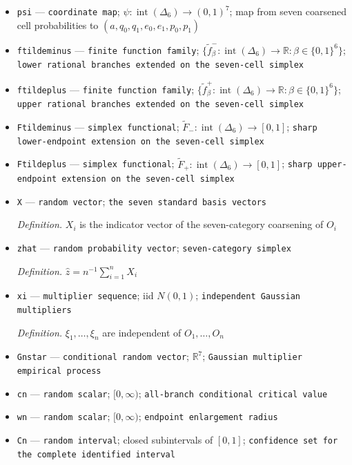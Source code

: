 \documentclass{article}
\begin{document}
\begin{itemize}
  \par\smallskip\noindent\emph{Definition.} \(z=(z_\varnothing,z_{0\mathrm N},z_{1\mathrm N},z_{00},z_{01},z_{10},z_{11})\), where \(z_\varnothing=P(A_0=0)\), \(z_{\ell\mathrm N}=P(A_0=1,L_1=\ell,A_1=0)\), and \(z_{\ell y}=P(A_0=A_1=1,L_1=\ell,Y=y)\) for \(\ell,y\in\{0,1\}\)
  \item \texttt{psi} --- \texttt{coordinate map}; \(\psi:\operatorname{int}(\Delta_6)\to(0,1)^7\); map from seven coarsened cell probabilities to \((a,q_0,q_1,e_0,e_1,p_0,p_1)\)
  \item \texttt{ftildeminus} --- \texttt{finite function family}; \(\{\widetilde f^-_\beta:\operatorname{int}(\Delta_6)\to\mathbb R:\beta\in\{0,1\}^6\}\); \texttt{lower rational branches extended on the seven-\allowbreak{}cell simplex}
  \item \texttt{ftildeplus} --- \texttt{finite function family}; \(\{\widetilde f^+_\beta:\operatorname{int}(\Delta_6)\to\mathbb R:\beta\in\{0,1\}^6\}\); \texttt{upper rational branches extended on the seven-\allowbreak{}cell simplex}
  \item \texttt{Ftildeminus} --- \texttt{simplex functional}; \(\widetilde F_-:\operatorname{int}(\Delta_6)\to[0,1]\); \texttt{sharp lower-\allowbreak{}endpoint extension on the seven-\allowbreak{}cell simplex}
  \item \texttt{Ftildeplus} --- \texttt{simplex functional}; \(\widetilde F_+:\operatorname{int}(\Delta_6)\to[0,1]\); \texttt{sharp upper-\allowbreak{}endpoint extension on the seven-\allowbreak{}cell simplex}
  \item \texttt{X} --- \texttt{random vector}; \texttt{the seven standard basis vectors}
  \par\smallskip\noindent\emph{Definition.} \(X_i\) is the indicator vector of the seven-category coarsening of \(O_i\)
  \item \texttt{zhat} --- \texttt{random probability vector}; \texttt{seven-\allowbreak{}category simplex}
  \par\smallskip\noindent\emph{Definition.} \(\widehat z=n^{-1}\sum_{i=1}^n X_i\)
  \item \texttt{xi} --- \texttt{multiplier sequence}; iid \(N(0,1)\); \texttt{independent Gaussian multipliers}
  \par\smallskip\noindent\emph{Definition.} \(\xi_1,\ldots,\xi_n\) are independent of \(O_1,\ldots,O_n\)
  \item \texttt{Gnstar} --- \texttt{conditional random vector}; \(\mathbb R^7\); \texttt{Gaussian multiplier empirical process}
  \item \texttt{cn} --- \texttt{random scalar}; \([0,\infty)\); \texttt{all-\allowbreak{}branch conditional critical value}
  \item \texttt{wn} --- \texttt{random scalar}; \([0,\infty)\); \texttt{endpoint enlargement radius}
  \item \texttt{Cn} --- \texttt{random interval}; closed subintervals of \([0,1]\); \texttt{confidence set for the complete identified interval}
\end{itemize}
\end{document}
